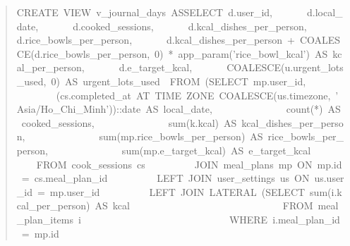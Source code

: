 \begin{quote}\scriptsize\ttfamily\raggedright
CREATE\ VIEW\ v\_\allowbreak{}journal\_\allowbreak{}days\ AS\newline{}SELECT\ d.user\_\allowbreak{}id,\newline{}\ \ \ \ \ \ \ d.local\_\allowbreak{}date,\newline{}\ \ \ \ \ \ \ d.cooked\_\allowbreak{}sessions,\newline{}\ \ \ \ \ \ \ d.kcal\_\allowbreak{}dishes\_\allowbreak{}per\_\allowbreak{}person,\newline{}\ \ \ \ \ \ \ d.rice\_\allowbreak{}bowls\_\allowbreak{}per\_\allowbreak{}person,\newline{}\ \ \ \ \ \ \ d.kcal\_\allowbreak{}dishes\_\allowbreak{}per\_\allowbreak{}person\ +\ COALESCE(d.rice\_\allowbreak{}bowls\_\allowbreak{}per\_\allowbreak{}person,\ 0)\ *\ app\_\allowbreak{}param('rice\_\allowbreak{}bowl\_\allowbreak{}kcal')\ AS\ kcal\_\allowbreak{}per\_\allowbreak{}person,\newline{}\ \ \ \ \ \ \ d.e\_\allowbreak{}target\_\allowbreak{}kcal,\newline{}\ \ \ \ \ \ \ COALESCE(u.urgent\_\allowbreak{}lots\_\allowbreak{}used,\ 0)\ AS\ urgent\_\allowbreak{}lots\_\allowbreak{}used\newline{}\ \ FROM\ (SELECT\ mp.user\_\allowbreak{}id,\newline{}\ \ \ \ \ \ \ \ \ \ \ \ \ \ \ (cs.completed\_\allowbreak{}at\ AT\ TIME\ ZONE\ COALESCE(us.timezone,\ 'Asia/\allowbreak{}Ho\_\allowbreak{}Chi\_\allowbreak{}Minh'))::date\ AS\ local\_\allowbreak{}date,\newline{}\ \ \ \ \ \ \ \ \ \ \ \ \ \ \ count(*)\ AS\ cooked\_\allowbreak{}sessions,\newline{}\ \ \ \ \ \ \ \ \ \ \ \ \ \ \ sum(k.kcal)\ AS\ kcal\_\allowbreak{}dishes\_\allowbreak{}per\_\allowbreak{}person,\newline{}\ \ \ \ \ \ \ \ \ \ \ \ \ \ \ sum(mp.rice\_\allowbreak{}bowls\_\allowbreak{}per\_\allowbreak{}person)\ AS\ rice\_\allowbreak{}bowls\_\allowbreak{}per\_\allowbreak{}person,\newline{}\ \ \ \ \ \ \ \ \ \ \ \ \ \ \ sum(mp.e\_\allowbreak{}target\_\allowbreak{}kcal)\ AS\ e\_\allowbreak{}target\_\allowbreak{}kcal\newline{}\ \ \ \ \ \ \ \ \ \ FROM\ cook\_\allowbreak{}sessions\ cs\newline{}\ \ \ \ \ \ \ \ \ \ JOIN\ meal\_\allowbreak{}plans\ mp\ ON\ mp.id\ =\ cs.meal\_\allowbreak{}plan\_\allowbreak{}id\newline{}\ \ \ \ \ \ \ \ \ \ LEFT\ JOIN\ user\_\allowbreak{}settings\ us\ ON\ us.user\_\allowbreak{}id\ =\ mp.user\_\allowbreak{}id\newline{}\ \ \ \ \ \ \ \ \ \ LEFT\ JOIN\ LATERAL\ (SELECT\ sum(i.kcal\_\allowbreak{}per\_\allowbreak{}person)\ AS\ kcal\newline{}\ \ \ \ \ \ \ \ \ \ \ \ \ \ \ \ \ \ \ \ \ \ \ \ \ \ \ \ \ \ \ FROM\ meal\_\allowbreak{}plan\_\allowbreak{}items\ i\newline{}\ \ \ \ \ \ \ \ \ \ \ \ \ \ \ \ \ \ \ \ \ \ \ \ \ \ \ \ \ \ WHERE\ i.meal\_\allowbreak{}plan\_\allowbreak{}id\ =\ mp.id\newline{}\ \ \ \ \ \ \ \ \ \ \ \ 
\end{quote}
